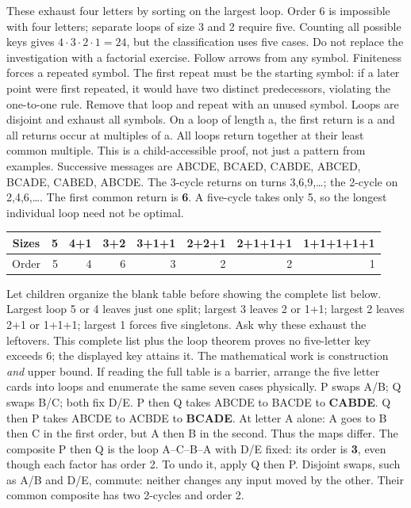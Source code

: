 \documentclass[12pt]{extarticle}
\begin{document}
These exhaust four letters by sorting on the largest loop. Order 6 is impossible with four letters; separate loops of size 3 and 2 require five. Counting all possible keys gives \(4\cdot3\cdot2\cdot1=24\), but the classification uses five cases. Do not replace the investigation with a factorial exercise.
Follow arrows from any symbol. Finiteness forces a repeated symbol. The first repeat must be the starting symbol: if a later point were first repeated, it would have two distinct predecessors, violating the one-to-one rule. Remove that loop and repeat with an unused symbol. Loops are disjoint and exhaust all symbols. On a loop of length a, the first return is a and all returns occur at multiples of a. All loops return together at their least common multiple. This is a child-accessible proof, not just a pattern from examples.
\newpage
{}
Successive messages are ABCDE, BCAED, CABDE, ABCED, BCADE, CABED, ABCDE. The 3-cycle returns on turns 3,6,9,\ldots; the 2-cycle on 2,4,6,\ldots. The first common return is \textbf{6}. A five-cycle takes only 5, so the longest individual loop need not be optimal.
\begin{center}\renewcommand{\arraystretch}{1.3}\begin{tabular}{c|rrrrrrr}Sizes&5&4+1&3+2&3+1+1&2+2+1&2+1+1+1&1+1+1+1+1\\\hline Order&5&4&6&3&2&2&1\end{tabular}\end{center}
Let children organize the blank table before showing the complete list below. Largest loop 5 or 4 leaves just one split; largest 3 leaves 2 or 1+1; largest 2 leaves 2+1 or 1+1+1; largest 1 forces five singletons. Ask why these exhaust the leftovers. This complete list plus the loop theorem proves no five-letter key exceeds 6; the displayed key attains it. The mathematical work is construction \emph{and} upper bound. If reading the full table is a barrier, arrange the five letter cards into loops and enumerate the same seven cases physically.
P swaps A/B; Q swaps B/C; both fix D/E. P then Q takes ABCDE to BACDE to \textbf{CABDE}. Q then P takes ABCDE to ACBDE to \textbf{BCADE}. At letter A alone: A goes to B then C in the first order, but A then B in the second. Thus the maps differ.
The composite P then Q is the loop A--C--B--A with D/E fixed: its order is \textbf{3}, even though each factor has order 2. To undo it, apply Q then P. Disjoint swaps, such as A/B and D/E, commute: neither changes any input moved by the other. Their common composite has two 2-cycles and order 2.
\end{document}
